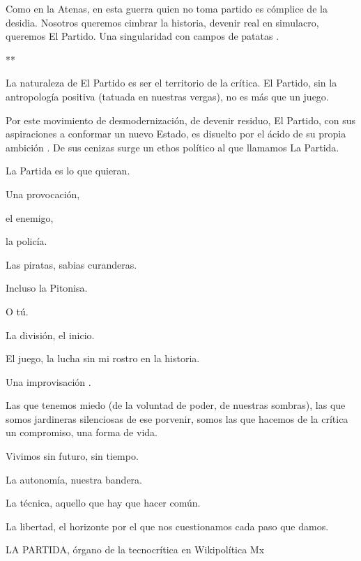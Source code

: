 Como en la Atenas, en esta guerra quien no toma partido es cómplice de
la desidia. Nosotros queremos cimbrar la historia, devenir real en
simulacro, queremos El Partido. Una singularidad con campos de
patatas \cite{Wikipedia2023a}.

**

La naturaleza de El Partido es ser el territorio de la crítica. El
Partido, sin la antropología positiva (tatuada en nuestras vergas), no
es más que un juego.

Por este movimiento de desmodernización, de devenir residuo, El Partido,
con sus aspiraciones a conformar un nuevo Estado, es disuelto por el
ácido de su propia ambición \cite{Tiqqun2013a}. De sus
cenizas surge un ethos político al que llamamos La Partida.

La Partida es lo que quieran.

Una provocación,

el enemigo,

la policía.

Las piratas, sabias curanderas.

Incluso la Pitonisa.

O tú.

La división, el inicio.

El juego, la lucha sin mi rostro en la historia.

Una improvisación \cite{Icle2009}.

Las que tenemos miedo (de la voluntad de poder, de nuestras sombras),
las que somos jardineras silenciosas de ese porvenir, somos las que
hacemos de la crítica un compromiso, una forma de vida.

Vivimos sin futuro, sin tiempo.

La autonomía, nuestra bandera.

La técnica, aquello que hay que hacer común.

La libertad, el horizonte por el que nos cuestionamos cada paso que
damos.

LA PARTIDA, órgano de la tecnocrítica en Wikipolítica Mx
